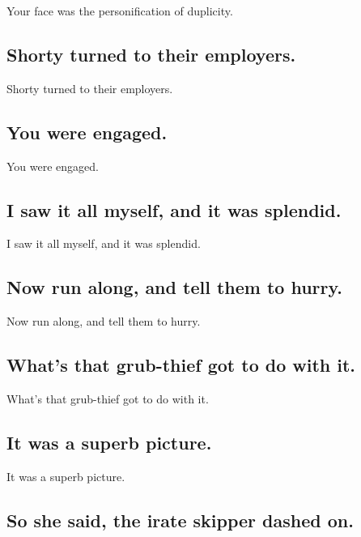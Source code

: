 \documentclass[]{article}
\begin{document}
Your face was the personification of duplicity.

\hypertarget{shorty-turned-to-their-employers.}{%
\subsection{Shorty turned to their
employers.}\label{shorty-turned-to-their-employers.}}

Shorty turned to their employers.

\hypertarget{you-were-engaged.}{%
\subsection{You were engaged.}\label{you-were-engaged.}}

You were engaged.

\hypertarget{i-saw-it-all-myself-and-it-was-splendid.}{%
\subsection{I saw it all myself, and it was
splendid.}\label{i-saw-it-all-myself-and-it-was-splendid.}}

I saw it all myself, and it was splendid.

\hypertarget{now-run-along-and-tell-them-to-hurry.}{%
\subsection{Now run along, and tell them to
hurry.}\label{now-run-along-and-tell-them-to-hurry.}}

Now run along, and tell them to hurry.

\hypertarget{whats-that-grub-thief-got-to-do-with-it.}{%
\subsection{What's that grub-thief got to do with
it.}\label{whats-that-grub-thief-got-to-do-with-it.}}

What's that grub-thief got to do with it.

\hypertarget{it-was-a-superb-picture.}{%
\subsection{It was a superb picture.}\label{it-was-a-superb-picture.}}

It was a superb picture.

\hypertarget{so-she-said-the-irate-skipper-dashed-on.}{%
\subsection{So she said, the irate skipper dashed
on.}\label{so-she-said-the-irate-skipper-dashed-on.}}
\end{document}
